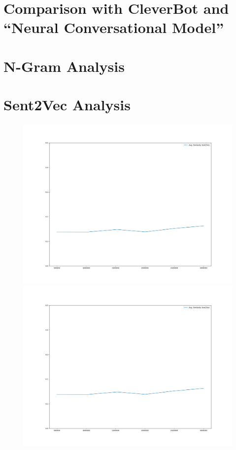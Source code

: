 \section{Comparison with CleverBot and ``Neural Conversational Model''}
\blindtext

\section{N-Gram Analysis}
\blindtext

\section{Sent2Vec Analysis}

\begin{figure}[H]
	\includegraphics[width=\linewidth]{img/plots/opensubtitles_not_reversed/s2v_wiki_cosine_similarity.png}
	\centering
	\small
	\endminipage\hfill
	\includegraphics[width=\linewidth]{img/plots/opensubtitles_not_reversed/s2v_twitter_cosine_similarity.png}

\end{figure}
